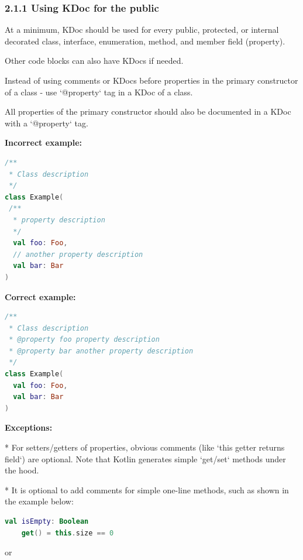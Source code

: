 \subsubsection*{\textbf{2.1.1 Using KDoc for the public}}
\leavevmode\newline



At a minimum, KDoc should be used for every public, protected, or internal decorated class, interface, enumeration, method, and member field (property).

Other code blocks can also have KDocs if needed.

Instead of using comments or KDocs before properties in the primary constructor of a class - use `@property` tag in a KDoc of a class.

All properties of the primary constructor should also be documented in a KDoc with a `@property` tag.





\textbf{Incorrect example:}

\begin{lstlisting}[language=Kotlin]
/**
 * Class description
 */
class Example(
 /**
  * property description
  */
  val foo: Foo,
  // another property description
  val bar: Bar
)
\end{lstlisting}


\textbf{Correct example:}

\begin{lstlisting}[language=Kotlin]
/**
 * Class description
 * @property foo property description
 * @property bar another property description
 */
class Example(
  val foo: Foo,
  val bar: Bar
)
\end{lstlisting}


\textbf{Exceptions:}



* For setters/getters of properties, obvious comments (like `this getter returns field`) are optional. Note that Kotlin generates simple `get/set` methods under the hood.

   

* It is optional to add comments for simple one-line methods, such as shown in the example below:

\begin{lstlisting}[language=Kotlin]
val isEmpty: Boolean
    get() = this.size == 0
\end{lstlisting}


or



